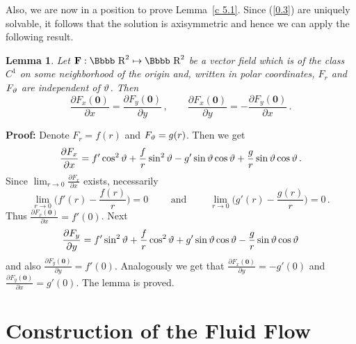 \documentclass[12pt,twoside]{article}
\newtheorem{lema}{Lemma}[section]
\newcommand {\rdd}{\mbox{\Bbbb R}}
\newcommand {\bnul}{{\mathbf {0}}}
\newcommand {\bF}{{\mathbf{F}}}
\newcommand {\pder}[2]{\frac {\partial #1}{\partial #2}}
\newcommand {\demo}{{\bf Proof:} }
\def\kondemo{\hfill \vrule width7pt height7pt depth0pt}
\begin{document}
\bigskip


Also, we are now in a position to prove Lemma~\ref{c 5.1}.  Since
(\ref{0.3})
are uniquely solvable, it follows that 
the solution is axisymmetric and hence we can apply the following result.

\begin{lema} \label{l 5.1}
Let $\bF: \rdd^2 \mapsto \rdd^2$ be a vector field which is of the 
class $C^1$ on some neighborhood of the origin and, written in polar 
coordinates, $F_r$ and $F_\vartheta$ are independent of $\vartheta$. Then
$$
\pder{F_x(\bnul)}{x} = \pder{F_y(\bnul)}{y}\, , \qquad 
\pder{F_x(\bnul)}{y} = -\pder{F_y(\bnul)}{x}\, .
$$
\end{lema}

\demo
Denote $F_r = f(r)$ and $F_\vartheta = g(r)$. Then we get
$$
\pder{F_x}{x} = f' \cos^2 \vt + \frac{f}{r} \sin^2 \vt - g' \sin \vt 
\cos \vt + \frac{g}{r} \sin \vt \cos \vt\, .
$$
Since $\lim_{r\to 0} \pder{F_x}{x}$ exists, necessarily 
$$
\lim_{r\to 0} \Big(f'(r) - \frac{f(r)}{r}\Big) = 0 \qquad \mbox{ and }
\qquad \lim_{r\to 0} \Big(g'(r) - \frac{g(r)}{r}\Big) = 0\, .
$$
Thus $\pder{F_x(\bnul)}{x} = f'(0)$. Next
$$
\pder{F_y}{y} = f' \sin^2 \vt + \frac{f}{r} \cos^2 \vt + g' \sin \vt 
\cos \vt - \frac{g}{r} \sin \vt \cos \vt
$$
and also $\pder{F_y(\bnul)}{y} = f'(0)$. Analogously we get that
$\pder{F_x(\bnul)}{y} = -g'(0)$ and $\pder{F_y(\bnul)}{x} = g'(0)$.
The lemma is proved. \kondemo















\section{Construction of the Fluid Flow}
\end{document}
